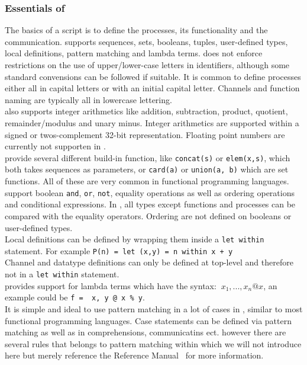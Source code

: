 \subsubsection{Essentials of \cspm}
The basics of a \cspm script is to define the processes, its functionality and the communication. \cspm supports sequences, sets, booleans, tuples, user-defined types, local definitions, pattern matching and lambda terms.
\cspm does not enforce restrictions on the use of upper/lower-case letters in identifiers, although some standard convensions can be followed if suitable. It is common to define processes either all in capital letters or with an initial capital letter. Channels and function naming are typically all in lowercase lettering.\\

\cspm also supports integer arithmetics like addition, subtraction, product, quotient, remainder/modulus and unary minus. Integer arithmetics are supported within a signed or twos-complement 32-bit representation.
Floating point numbers are currently not supporten in \cspm. \\

\cspm provide several different build-in function, like \texttt{concat(s)} or \texttt{elem(x,s)}, which both takes sequences as parameters, or \texttt{card(a)} or \texttt{union(a, b)} which are set functions. All of these are very common in functional programming languages. \cspm support boolean \texttt{and}, \texttt{or}, \texttt{not}, equality operations as well as ordering operations and conditional expressions. In \cspm, all types except functions and processes can be compared with the equality operators. Ordering are not defined on booleans or user-defined types. \\

Local definitions can be defined by wrapping them inside a \texttt{let within} statement. For example \texttt{P(n) = let (x,y) = n within x + y }\\ Channel and datatype definitions can only be defined at top-level and therefore not in a \texttt{let within} statement. \\
\cspm provides support for lambda terms which have the syntax: $\ x_1,...,x_n @ x$, an example could be \texttt{f = \ x, y @ x \% y}. \\
It is simple and ideal to use pattern matching in a lot of cases in \cspm, similar to most functional programming languages. Case statements can be defined via pattern matching as well as in comprehensions, communicatins ect. however there are several rules that belongs to pattern matching within \cspm which we will not introduce here but merely reference the \cspm Reference Manual~\cite{Scattergood2011} for more information. \\


